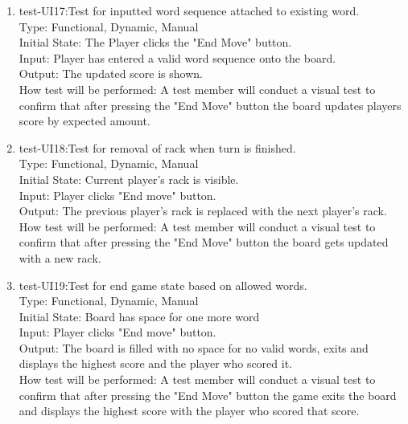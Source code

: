 \documentclass[12pt, titlepage]{article}
\begin{document}
\begin{enumerate}
    \item{test-UI17:Test for inputted word sequence attached to existing word.\\} %
    Type: Functional, Dynamic, Manual\\
    Initial State: The Player clicks the "End Move" button.\\
    Input: Player has entered a valid word sequence onto the board. \\
    Output: The updated score is shown. \\
    How test will be performed: A test member will conduct a visual test to confirm that after pressing the "End Move" button the board updates players score by expected amount.\\
    
    \item{test-UI18:Test for removal of rack when turn is finished.\\} %
    Type: Functional, Dynamic, Manual\\
    Initial State: Current player's rack is visible.\\
    Input: Player clicks "End move" button. \\
    Output: The previous player's rack is replaced with the next player's rack. \\
    How test will be performed: A test member will conduct a visual test to confirm that after pressing the "End Move" button the board gets updated with a new rack.\\
    
    \item{test-UI19:Test for end game state based on allowed words.\\} %
    Type: Functional, Dynamic, Manual\\
    Initial State: Board has space for one more word\\
    Input: Player clicks "End move" button. \\
    Output: The board is filled with no space for no valid words, exits and displays the highest score and the player who scored it. \\
    How test will be performed: A test member will conduct a visual test to confirm that after pressing the "End Move" button the game exits the board and displays the highest score with the player who scored that score.\\
    

\end{enumerate}
\end{document}
